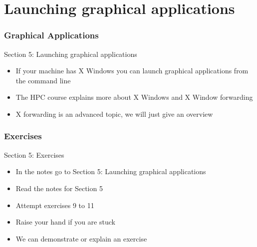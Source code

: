 \part{Launching graphical applications}
\begin{frame}
\partpage
\end{frame}

\section{Graphical Applications}
\begin{frame}{Section 5: Launching graphical applications}
\begin{itemize}
\item If your machine has X Windows you can launch graphical applications from the command line
\item The HPC course explains more about X Windows and X Window forwarding
\item X forwarding is an advanced topic, we will just give an overview
\end{itemize}
\end{frame}

\section{Exercises}
\begin{frame}{Section 5: Exercises}
\begin{itemize}
\item In the notes go to {Section 5: Launching graphical applications}
\item Read the notes for Section 5 
\item Attempt exercises 9 to 11
\item Raise your hand if you are stuck
\item We can demonstrate or explain an exercise
\end{itemize}
\end{frame}